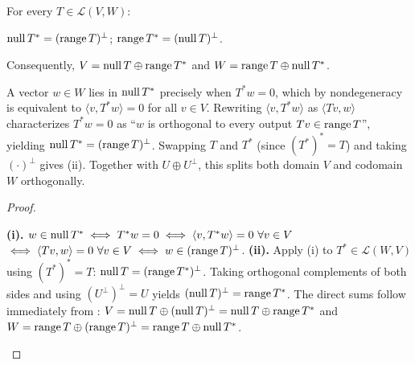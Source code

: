 \documentclass[10pt]{scrartcl}
\newcommand{\LL}{\mathcal L}\newcommand{\PP}{\mathcal P}\newcommand{\MM}{\mathcal M}
\begin{document}
\begin{theorem*}
  For every $T\in\LL(V,W)$:
  \begin{enumerate}
    \ii[(i)] $\operatorname{null} T^* = (\operatorname{range} T)^\perp$;
    \ii[(ii)] $\operatorname{range} T^* = (\operatorname{null} T)^\perp$.
  \end{enumerate}
  Consequently, $V = \operatorname{null} T \oplus \operatorname{range} T^*$ and $W = \operatorname{range} T \oplus \operatorname{null} T^*$.
\end{theorem*}
\begin{ideabox}
  A vector $w\in W$ lies in $\operatorname{null} T^*$ precisely when $T^*w=0$, which by nondegeneracy  is equivalent to $\langle v,T^*w\rangle=0$ for all $v\in V$. Rewriting $\langle v,T^*w\rangle$ as $\langle Tv,w\rangle$ characterizes $T^*w=0$ as ``$w$ is orthogonal to every output $Tv\in\operatorname{range} T$'', yielding $\operatorname{null} T^*=(\operatorname{range} T)^\perp$. Swapping $T$ and $T^*$ (since $(T^*)^*=T$) and taking $(\cdot)^\perp$ gives (ii). Together with $U\oplus U^\perp$, this splits both domain $V$ and codomain $W$ orthogonally.
\end{ideabox}
\begin{proof}
  \begin{steps}
    \ii \textbf{(i).} $w\in\operatorname{null} T^* \iff T^*w=0 \iff \langle v,T^*w\rangle=0\ \forall v\in V$  $\iff \langle Tv,w\rangle=0\ \forall v\in V \iff w\in(\operatorname{range} T)^\perp$.
    \ii \textbf{(ii).} Apply (i) to $T^*\in\LL(W,V)$ using $(T^*)^*=T$: $\operatorname{null} T = (\operatorname{range} T^*)^\perp$. Taking orthogonal complements of both sides and using $(U^\perp)^\perp=U$  yields $(\operatorname{null} T)^\perp = \operatorname{range} T^*$.
    \ii The direct sums follow immediately from : $V=\operatorname{null} T\oplus(\operatorname{null} T)^\perp = \operatorname{null} T\oplus\operatorname{range} T^*$ and $W=\operatorname{range} T\oplus(\operatorname{range} T)^\perp=\operatorname{range} T\oplus\operatorname{null} T^*$.
  \end{steps}
\end{proof}
\end{document}
